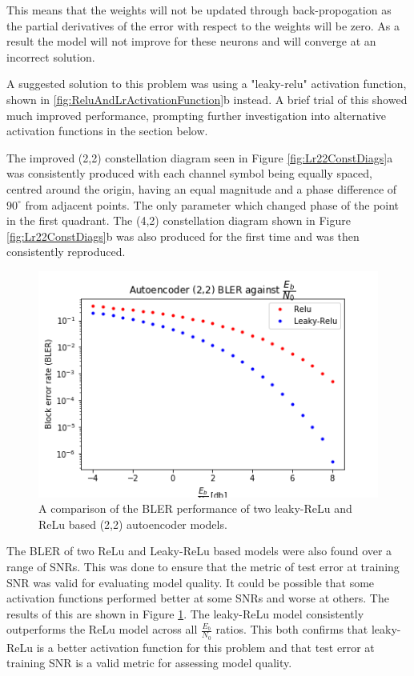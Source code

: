 \documentclass[12pt,onecolumn,letterpaper]{article}
\begin{document}
This means that the weights will not be updated through back-propogation as the partial derivatives of the error with respect to the weights will be zero. As a result the model will not improve for these neurons and will converge at an incorrect solution. 

A suggested solution to this problem was using a "leaky-relu" activation function, shown in \ref{fig:ReluAndLrActivationFunction}b instead. A brief trial of this showed much improved performance, prompting further investigation into alternative activation functions in the section below. 

The improved (2,2) constellation diagram seen in Figure \ref{fig:Lr22ConstDiags}a was consistently produced with each channel symbol being equally spaced, centred around the origin, having an equal magnitude and a phase difference of $90^{\circ}$ from adjacent points. The only parameter which changed phase of the point in the first quadrant. The (4,2) constellation diagram shown in Figure \ref{fig:Lr22ConstDiags}b was also produced for the first time and was then consistently reproduced. 

\begin{figure}[t]
   \centering
   \includegraphics[width=0.4\linewidth]{figures/autoencoder_2_2_bler_EbNo_leaky_vs_relu.png}
   \caption{A comparison of the BLER performance of two leaky-ReLu and ReLu based (2,2) autoencoder models.}
   \label{fig:ReluVsLrBlerAcrossSnrs}
\end{figure}

The BLER of two ReLu and Leaky-ReLu based models were also found over a range of SNRs. This was done to ensure that the metric of test error at training SNR was valid for evaluating model quality. It could be possible that some activation functions performed better at some SNRs and worse at others. The results of this are shown in Figure \ref{fig:ReluVsLrBlerAcrossSnrs}. The leaky-ReLu model consistently outperforms the ReLu model across all $\frac{E_b}{N_0}$ ratios. This both confirms that leaky-ReLu is a better activation function for this problem and that test error at training SNR is a valid metric for assessing model quality.
\end{document}

